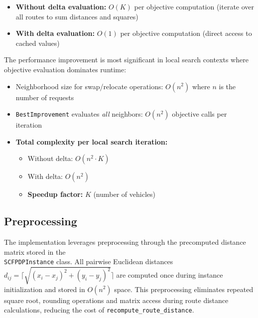 \documentclass[a4paper]{scrartcl}
\begin{document}
\begin{itemize}
  \item \textbf{Without delta evaluation:} $O(K)$ per objective computation (iterate over all routes to sum distances and squares)
  \item \textbf{With delta evaluation:} $O(1)$ per objective computation (direct access to cached values)
\end{itemize}

The performance improvement is most significant in local search contexts where objective evaluation dominates runtime:
\begin{itemize}
  \item Neighborhood size for swap/relocate operations: $O(n^2)$ where $n$ is the number of requests
  \item \texttt{BestImprovement} evaluates \emph{all} neighbors: $O(n^2)$ objective calls per iteration
  \item \textbf{Total complexity per local search iteration:}
  \begin{itemize}
      \item Without delta: $O(n^2 \cdot K)$
      \item With delta: $O(n^2)$
      \item \textbf{Speedup factor:} $K$ (number of vehicles)
  \end{itemize}
\end{itemize}

\subsection{Preprocessing}
The implementation leverages preprocessing through the precomputed distance matrix stored in the \\ \texttt{SCFPDPInstance} class. All pairwise Euclidean distances $\displaystyle d_{ij} = \lceil \sqrt{(x_i - x_j)^2 + (y_i - y_j)^2} \rceil$ are computed once during instance initialization and stored in $O(n^2)$ space. This preprocessing eliminates repeated square root, rounding operations and matrix access during route distance calculations, reducing the cost of \texttt{recompute\_route\_distance}.
\end{document}
